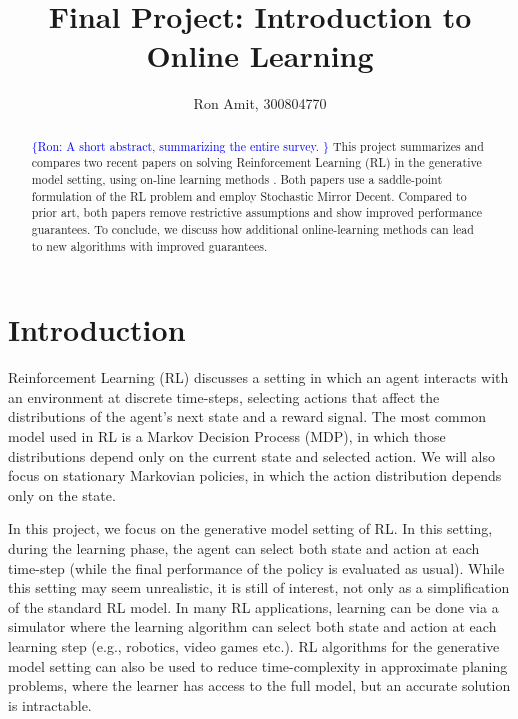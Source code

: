 \documentclass{article}
\title{Final Project: Introduction to Online Learning}
\author{Ron Amit, 300804770 }
\newcommand{\ra}[1]{\textcolor{blue}{\{Ron: #1\}}}
\begin{document}
\maketitle

\begin{abstract}
\ra{
    A short abstract, summarizing the entire survey.
    }
    This project summarizes and compares two recent papers on solving Reinforcement Learning (RL) in the generative model setting, using on-line learning methods \citep{cheng2020reduction, jin20efficiently}.
    Both papers use a saddle-point formulation of the RL problem and employ Stochastic Mirror Decent.
    Compared to prior art, both papers remove restrictive assumptions and show improved performance guarantees. 
    To conclude, we discuss how additional online-learning methods can lead to new algorithms with improved guarantees. 
\end{abstract}

\section{Introduction}

Reinforcement Learning (RL) discusses a setting in which an agent interacts with an environment at discrete time-steps, selecting actions that affect the distributions of the agent's next state and a reward signal.
The most common model used in RL is a Markov Decision Process (MDP), in which those distributions depend only on the current state and selected action.
We will also focus on stationary Markovian policies, in which the action distribution depends only on the state.

In this project, we focus on the generative model setting of RL.
In this setting, during the learning phase, the agent can select both state and action at each time-step (while the final performance of the policy is evaluated as usual).
While this setting may seem unrealistic, it is still of interest, not only as a simplification of the standard RL model. 
In many RL applications, learning can be done via a simulator where the learning algorithm can select both state and action at each learning step (e.g., robotics, video games etc.).
RL algorithms for the generative model setting can also be used to reduce time-complexity in approximate planing problems, where the learner has access to the full model, but an accurate solution is intractable.
\end{document}
